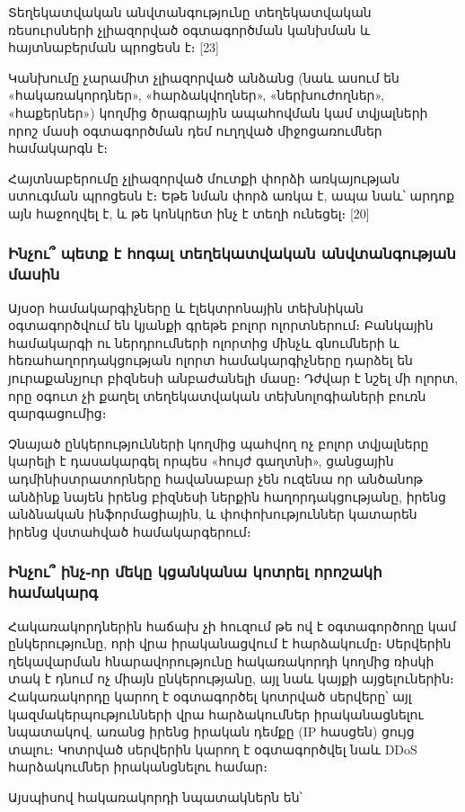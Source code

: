 \documentclass[11pt]{article}
\begin{document}
\begin{sloppypar}
Տեղեկատվական անվտանգությունը տեղեկատվական ռեսուրսների չլիազորված օգտագործման
կանխման և հայտնաբերման պրոցեսն է։ [23]

Կանխումը չարամիտ չլիազորված անձանց (նաև ասում են «հակառակորդներ»,
«հարձակվողներ», «ներխուժողներ», «հաքերներ») կողմից ծրագրային ապահովման կամ
տվյալների որոշ մասի օգտագործման դեմ ուղղված միջոցառումներ համակարգն է։

Հայտնաբերումը չլիազորված մուտքի փորձի առկայության ստուգման պրոցեսն է։ Եթե
նման փորձ առկա է, ապա նաև՝ արդոք այն հաջողվել է, և թե կոնկրետ ինչ է տեղի
ունեցել։ [20]

\subsubsection{Ինչու՞ պետք է հոգալ տեղեկատվական անվտանգության մասին}

Այսօր համակարգիչները և էլեկտրոնային տեխնիկան օգտագործվում են
կյանքի գրեթե բոլոր ոլորտներում։ Բանկային համակարգի ու ներդրումների ոլորտից
մինչև գնումների և հեռահաղորդակցության ոլորտ համակարգիչները դարձել են
յուրաքանչյուր բիզնեսի անբաժանելի մասը։ Դժվար է նշել մի ոլորտ, որը
օգուտ չի քաղել տեղեկատվական տեխնոլոգիաների բուռն զարգացումից։

Չնայած ընկերությունների կողմից պահվող ոչ բոլոր տվյալները կարելի է
դասակարգել որպես «հույժ գաղտնի», ցանցային ադմինիստրատորները հավանաբար
չեն ուզենա որ անծանոթ անձինք նայեն իրենց բիզնեսի ներքին հաղորդակցությանը,
իրենց անձնական ինֆորմացիային, և փոփոխություններ կատարեն իրենց վստահված
համակարգերում։

\subsubsection{Ինչու՞ ինչ֊որ մեկը կցանկանա կոտրել որոշակի համակարգ}

Հակառակորդներին հաճախ չի հուզում թե ով է օգտագործողը կամ ընկերությունը,
որի վրա իրականացվում է հարձակումը։
Սերվերին ղեկավարման հնարավորությունը հակառակորդի կողմից ռիսկի տակ է
դնում ոչ միայն ընկերությանը, այլ նաև կայքի այցելուներին։
Հակառակորդը կարող է օգտագործել կոտրված սերվերը՝ այլ կազմակերպությունների
վրա հարձակումներ իրականացնելու նպատակով, առանց իրենց իրական դեմքը
(IP հասցեն) ցույց տալու։ Կոտրված սերվերին կարող է օգտագործվել նաև
DDoS հարձակումներ իրականցնելու համար։

Այսպիսով հակառակորդի նպատակներն են՝


\end{sloppypar}
\end{document}

